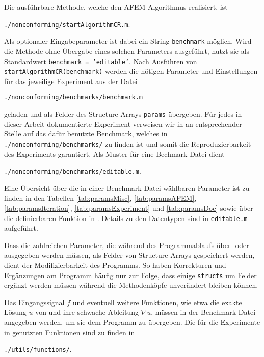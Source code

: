 Die ausführbare Methode, welche den AFEM-Algorithmus realisiert, ist
\begin{center}
  \texttt{./nonconforming/startAlgorithmCR.m}.
\end{center}
Als optionaler Eingabeparameter ist dabei ein String \texttt{benchmark}
möglich. 
Wird die Methode ohne Übergabe eines solchen Parameters ausgeführt, nutzt
sie als Standardwert \texttt{benchmark = 'editable'}.
Nach Ausführen von \texttt{startAlgorithmCR(benchmark)} werden die nötigen
Parameter und Einstellungen für das jeweilige Experiment aus der Datei
\begin{center}
  \texttt{./nonconforming/benchmarks/benchmark.m}
\end{center}
geladen und als Felder des Structure Arrays \texttt{params} übergeben. Für
jedes in dieser Arbeit dokumentierte Experiment verweisen wir in
 an entsprechender Stelle auf das dafür benutzte 
Benchmark, welches in \texttt{./nonconforming/benchmarks/} zu finden ist und
somit die Reproduzierbarkeit des Experiments garantiert. 
Als Muster für eine Bechmark-Datei dient
\begin{center}
  \texttt{./nonconforming/benchmarks/editable.m}.
\end{center}
Eine Übersicht über die in einer Benchmark-Datei wählbaren Parameter ist
zu finden in den Tabellen \ref{tab:paramsMisc}, \ref{tab:paramsAFEM}, 
\ref{tab:paramsIteration}, \ref{tab:paramsExperiment} und \ref{tab:paramsDoc}
sowie über die definierbaren Funktion in .
Details zu den Datentypen sind in \texttt{editable.m} aufgeführt.

Dass die zahlreichen Parameter, die während des Pro\-gramm\-ab\-laufs
über- oder ausgegeben werden müssen, als Felder von
Struc\-ture Ar\-rays gespeichert werden, dient der Modifizierbarkeit des
Programms. 
So haben Korrekturen und Ergänzungen am Programm häufig nur zur Folge, dass
einige \texttt{structs} um Felder ergänzt werden müssen während die 
Methodenköpfe unverändert bleiben können.

Das Eingangssignal $f$ und eventuell weitere Funktionen, wie etwa die exakte
Lösung $u$ von  und ihre schwache Ableitung
$\nabla u$, müssen in der Benchmark-Datei angegeben werden, um sie dem
Programm zu übergeben. 
Die für die Experimente in  genutzten Funktionen sind zu
finden in 
\begin{center}
  \texttt{./utils/functions/}.
\end{center}

